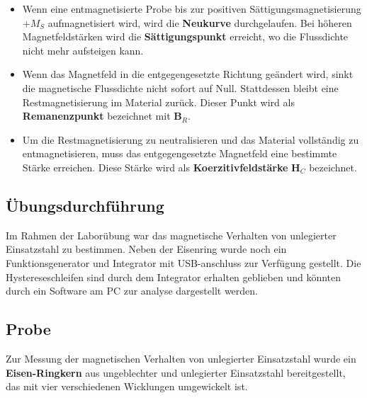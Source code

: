 \documentclass[a4paper,twoside,12pt,DIV=13,BCOR=5mm,numbers=noenddot,cleardoublepage=empty]{scrbook}
\begin{document}
    \begin{itemize}
        \item  Wenn eine entmagnetisierte Probe bis zur positiven Sättigungsmagnetisierung $+M_S$ aufmagnetisiert wird, wird die \textbf{Neukurve} durchgelaufen. Bei höheren Magnetfeldstärken wird die \textbf{Sättigungspunkt} erreicht, wo die Flussdichte nicht mehr aufsteigen kann.
        \item Wenn das Magnetfeld in die entgegengesetzte Richtung geändert wird, sinkt die magnetische Flussdichte nicht sofort auf Null. Stattdessen bleibt eine Restmagnetisierung im Material zurück. Dieser Punkt wird als \textbf{Remanenzpunkt} bezeichnet mit \textbf{B$_R$}.
        \item Um die Restmagnetisierung zu neutralisieren und das Material vollständig zu entmagnetisieren, muss das entgegengesetzte Magnetfeld eine bestimmte Stärke erreichen. Diese Stärke wird als \textbf{Koerzitivfeldstärke} \textbf{H$_C$} bezeichnet. \\
        
    \end{itemize}
    
    \subsection{Übungsdurchführung}
    
    Im Rahmen der Laborübung war das magnetische Verhalten von unlegierter Einsatzstahl zu bestimmen. Neben der Eisenring wurde noch ein Funktionsgenerator und Integrator mit USB-anschluss zur Verfügung gestellt. Die Hystereseschleifen sind durch dem Integrator erhalten geblieben und könnten durch ein Software am PC zur analyse dargestellt werden.

    \newpage
    
    \subsection{Probe}

    Zur Messung der magnetischen Verhalten von unlegierter Einsatzstahl wurde ein \textbf{Eisen-Ringkern} aus ungeblechter und unlegierter Einsatzstahl bereitgestellt, das mit vier verschiedenen Wicklungen umgewickelt ist.
\end{document}
